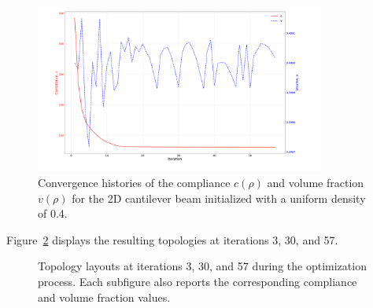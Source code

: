 \documentclass[mathpazo]{cicp}
\begin{document}
\vspace{-2ex} %
\begin{figure}[htp]
	\centering
	\includegraphics[width=0.85\textwidth]{figures/cantilever_2d_04_convergence.png}
	\caption{Convergence histories of the compliance $c(\rho)$ and volume fraction $v(\rho)$ for the 2D cantilever beam initialized with a uniform density of 0.4.}
	\label{fig:canti_04_convergence}
\end{figure}
\vspace{-2ex} %

Figure~\ref{fig:canti_04_all} displays the resulting topologies at iterations 3, 30, and 57.

\vspace{-2ex} %
\begin{figure}[htp]
	\centering
	\caption{Topology layouts at iterations 3, 30, and 57 during the optimization process. Each subfigure also reports the corresponding compliance and volume fraction values.}
	\label{fig:canti_04_all}
\end{figure}
\vspace{-2ex} %
\end{document}
